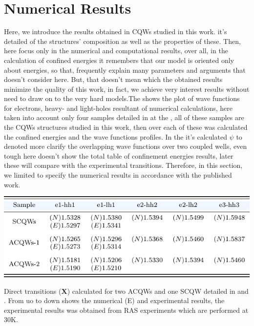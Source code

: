\section{Numerical Results}
\label{sec:chapter-2-numerical-results}
\vspace{-10mm} 
Here, we introduce the results obtained in \gls{CQWs} studied in this work. it's detailed of the structures' composition as well as the properties of these. Then, here focus only in the  numerical and computational results, over all, in the calculation of confined energies it remembers that our model is oriented only about energies, so that, frequently explain many parameters and arguments that doesn't consider here. But, that doesn't mean which the obtained results minimize the quality of this work, in fact, we achieve very interest results without need to draw on to the very hard models.The  shows the plot of wave functions for electrons, heavy- and light-holes resultant of numerical calculations, here taken into account only four samples detailed in  at the , all of these samples are the CQWs structures studied in this work, then over each of these was calculated the confined energies and the wave functions profiles. In the  it's calculated $\psi$ to denoted more clarify the overlapping wave functions over two coupled wells, even tough here doesn't show the total table of confinement energies results, later these will  compare with the experimental transitions.  Therefore, in this section, we limited to specify the numerical results  in accordance with the published work\cite{ruiz2021optical}. 
\begin{table}[H]
	\centering
	\includegraphics[width=\textwidth]{../tables/chapter-2/numerical-results/out/numerical-results.pdf}
	\caption{Direct transitions ($\mathbf{X}$) calculated for two ACQWs and one SCQW detailed in  and . From uo to down shows the numerical (E) and experimental results, the experimental results was obtained from RAS experiments which are performed at 30K. }
	\label{tab:sec-chapter-2-numerical-results} 
\end{table}
